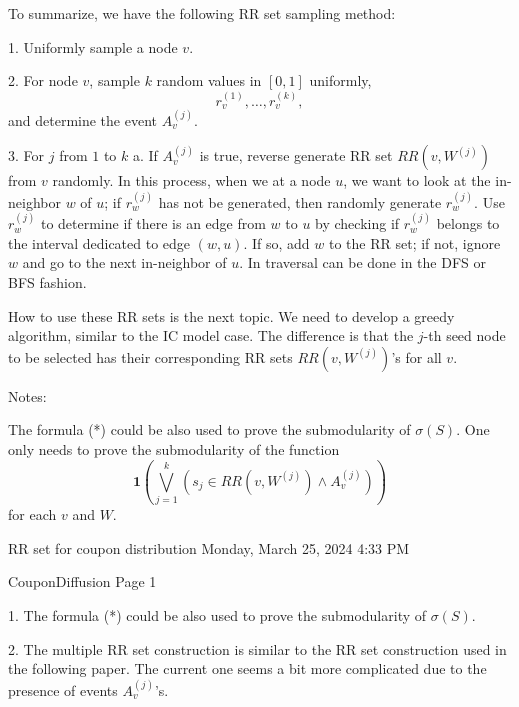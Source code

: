 \documentclass[11pt]{article}
\begin{document}
To summarize, we have the following RR set sampling method:

1. Uniformly sample a node $v$.

2. For node $v$, sample $k$ random values in $[0,1]$ uniformly,
\[
r_v^{(1)}, \dots, r_v^{(k)},
\]
and determine the event $A_v^{(j)}$.

3. For $j$ from $1$ to $k$  
a. If $A_v^{(j)}$ is true, reverse generate RR set $RR(v,W^{(j)})$ from $v$ randomly. In this process, when we at a node $u$, we want to look at the in-neighbor $w$ of $u$; if $r_w^{(j)}$ has not be generated, then randomly generate $r_w^{(j)}$. Use $r_w^{(j)}$ to determine if there is an edge from $w$ to $u$ by checking if $r_w^{(j)}$ belongs to the interval dedicated to edge $(w,u)$. If so, add $w$ to the RR set; if not, ignore $w$ and go to the next in-neighbor of $u$. In traversal can be done in the DFS or BFS fashion.

How to use these RR sets is the next topic. We need to develop a greedy algorithm, similar to the IC model case. The difference is that the $j$-th seed node to be selected has their corresponding RR sets $RR(v,W^{(j)})$'s for all $v$.

Notes:

The formula (*) could be also used to prove the submodularity of $\sigma(S)$. One only needs to prove the submodularity of the function
\[
\mathbf{1}\!\left(
\bigvee_{j=1}^k
\left(
s_j \in RR(v,W^{(j)}) \wedge A_v^{(j)}
\right)
\right)
\]
for each $v$ and $W$.

RR set for coupon distribution  
Monday, March 25, 2024 4:33 PM

CouponDiffusion Page 1

1. The formula (*) could be also used to prove the submodularity of $\sigma(S)$.

2. The multiple RR set construction is similar to the RR set construction used in the following paper. The current one seems a bit more complicated due to the presence of events $A_v^{(j)}$'s.
\end{document}
